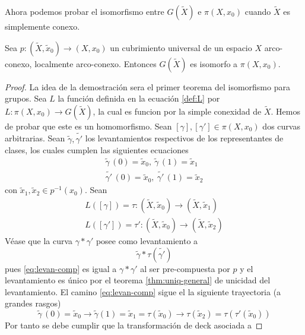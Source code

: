 Ahora podemos probar el isomorfismo entre \(G (\tilde X)\) e \(\pi (X,
x_0)\) cuando \(\tilde X\) es simplemente conexo.

\begin{teorema}
  Sea \(p : (\tilde X, \tilde x_0) \to (X , x_0) \) un cubrimiento
  universal de un espacio \(X\) arco-conexo, localmente arco-conexo.
  Entonces \(G (\tilde X)\) es isomorfo a \(\pi (X, x_0)\).
\end{teorema}
\begin{proof}
  La idea de la demostración sera el primer teorema del isomorfismo para
  grupos. Sea \(L\) la función definida en la ecuación \eqref{def:L} por
  \(L : \pi (X, x_0) \to G ( \tilde X)\), la cual es funcion por la simple
  conexidad de \(\tilde X\). Hemos de probar que este es un homomorfismo.
  Sean \([\gamma],[\gamma'] \in \pi (X , x_0)\) dos curvas arbitrarias.
  Sean \(\tilde \gamma , \tilde{\gamma '}\) los levantamientos respectivos
  de los representantes de clases, los cuales cumplen las siguientes
  ecuaciones
  \begin{gather*}
    \widetilde \gamma \, (0) = \widetilde x_0,\ \widetilde \gamma \, (1)
      = \widetilde x _1 \\
    \widetilde {\gamma '} \, (0) = \widetilde x_0,\ \widetilde {\gamma
      '} \, (1) = \widetilde x _2
  \end{gather*}
  con \(\tilde x_1 , \tilde x_2 \in p^{-1} (x_0)\). Sean
  \begin{gather*}
    L \left( [\gamma] \right) = \tau : (\tilde X , \tilde x_0) \to
    (\tilde X, \tilde x_1) \\
    L \left( [\gamma'] \right) = \tau' : (\tilde X , \tilde x_0) \to
    (\tilde X, \tilde x_2)
  \end{gather*}
  Véase que la curva \(\gamma * \gamma '\) posee como levantamiento a
  \begin{equation} \label{eq:levan-comp}
    \tilde \gamma * \tau \left( \widetilde{\gamma '} \right)
  \end{equation}
  pues \eqref{eq:levan-comp} es igual a \(\gamma * \gamma '\) al ser
  pre-compuesta por \(p\) y el levantamiento es único por el teorema
  \ref{thm:uniq-general} de unicidad del levantamiento. El camino
  \eqref{eq:levan-comp} sigue el la siguiente trayectoria (a grandes
  rasgos)
  \[ \tilde \gamma \, (0) = \tilde x_0 \longrightarrow \tilde \gamma (1) = \tilde x
      _1 = \tau \left( \tilde x_0 \right) \longrightarrow \tau \left( \tilde x_2
      \right) = \tau \left( \tau' ( \tilde x _0 ) \right)
  \]
  Por tanto se debe cumplir que la transformación de deck asociada a

\end{proof}
